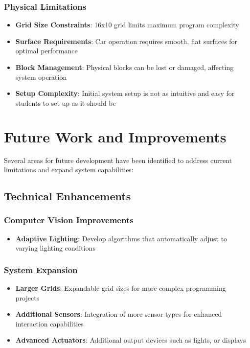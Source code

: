 \subsubsection{Physical Limitations}
\begin{itemize}
    \item \textbf{Grid Size Constraints}: 16x10 grid limits maximum program complexity
    \item \textbf{Surface Requirements}: Car operation requires smooth, flat surfaces for optimal performance
    \item \textbf{Block Management}: Physical blocks can be lost or damaged, affecting system operation
    \item \textbf{Setup Complexity}: Initial system setup is not as intuitive and easy for students to set up as it should be
\end{itemize}

\section{Future Work and Improvements}

Several areas for future development have been identified to address current limitations and expand system capabilities:

\subsection{Technical Enhancements}

\subsubsection{Computer Vision Improvements}
\begin{itemize}
    \item \textbf{Adaptive Lighting}: Develop algorithms that automatically adjust to varying lighting conditions
\end{itemize}

\subsubsection{System Expansion}
\begin{itemize}
    \item \textbf{Larger Grids}: Expandable grid sizes for more complex programming projects
    \item \textbf{Additional Sensors}: Integration of more sensor types for enhanced interaction capabilities
    \item \textbf{Advanced Actuators}: Additional output devices such as lights, or displays
\end{itemize}


